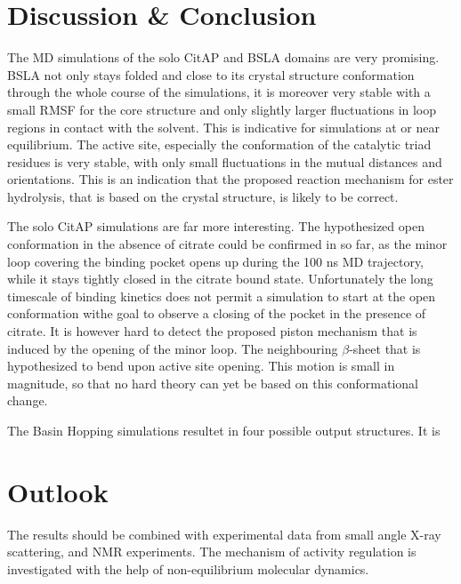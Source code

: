 \documentclass[english, a4paper, 12pt, titlepage, draft]{article}
\begin{document}

\section{Discussion \& Conclusion}

The MD simulations of the solo CitAP and BSLA domains are very promising.
BSLA not only stays folded and close to its crystal structure conformation through the whole course of the simulations, it is moreover very stable with a small RMSF for the core structure and only slightly larger fluctuations in loop regions in contact with the solvent.
This is indicative for simulations at or near equilibrium.
The active site, especially the conformation of the catalytic triad residues is very stable, with only small fluctuations in the mutual distances and orientations.
This is an indication that the proposed reaction mechanism for ester hydrolysis, that is based on the crystal structure, is likely to be correct.

The solo CitAP simulations are far more interesting.
The hypothesized open conformation in the absence of citrate could be confirmed in so far, as the minor loop covering the binding pocket opens up during the 100 ns MD trajectory, while it stays tightly closed in the citrate bound state.
Unfortunately the long timescale of binding kinetics does not permit a simulation to start at the open conformation withe goal to observe a closing of the pocket in the presence of citrate.
It is however hard to detect the proposed piston mechanism that is induced by the opening of the minor loop.
The neighbouring $\beta$-sheet that is hypothesized to bend upon active site opening.
This motion is small in magnitude, so that no hard theory can yet be based on this conformational change.

The Basin Hopping simulations resultet in four possible output structures.
It is 


\section{Outlook}
The results should be combined with experimental data from small angle X-ray scattering, and NMR experiments. The mechanism of activity regulation is investigated with the help of non-equilibrium molecular dynamics.
\end{document}
